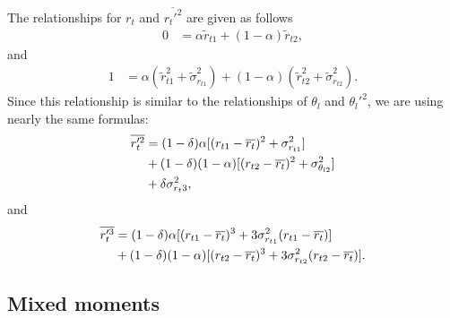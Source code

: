 The relationships for $r_t$ and $\overline{r_t'^2}$ are given as follows
\begin{align}
    \label{eq:rt_bar_nondim}
    0 &= \alpha \tilde{r}_{t1} + (1 - \alpha) \tilde{r}_{t2},
\end{align}
and
\begin{align}
    \label{rtptwo_nondim}
    1 &= \alpha \left( \tilde{r}_{t1}^2 + \tilde{\sigma}_{r_{t1}}^2 \right) +
    (1 - \alpha) \left( \tilde{r}_{t2}^2 + \tilde{\sigma}_{r_{t2}}^2 \right).
\end{align}
Since this relationship is similar to the relationships of $\theta_l$ and $\theta_l'^2$,
we are using nearly the same formulas:
\begin{align}
    \label{eq:r_t_prime_2_bar}
    \overline{r_t'^2}
    &= (1 - \delta) \alpha [(r_{t1} - \overline{r_t})^2 + \sigma_{r_{t1}}^2] \nonumber\\
    &+ (1 - \delta) (1 - \alpha) [(r_{t2} - \overline{r_t})^2 + \sigma_{\theta_{l2}}^2] \nonumber\\
    &+ \delta \sigma_{r_t 3}^2,
\end{align}
and
\begin{align}
    \label{eq:r_t_prime_3_bar}
    \overline{r_t'^3}
    &= (1 - \delta) \alpha [(r_{t1} - \overline{r_t})^3 + 3 \sigma_{r_{t1}}^2 (r_{t1} - \overline{r_t})] \nonumber\\
    &+ (1 - \delta) (1 - \alpha) [(r_{t2} - \overline{r_t})^3 + 3 \sigma_{r_{t2}}^2 (r_{t2} - \overline{r_t})].
\end{align}

\subsection{Mixed moments}\label{subsec:lowerordermoments_mixed}

